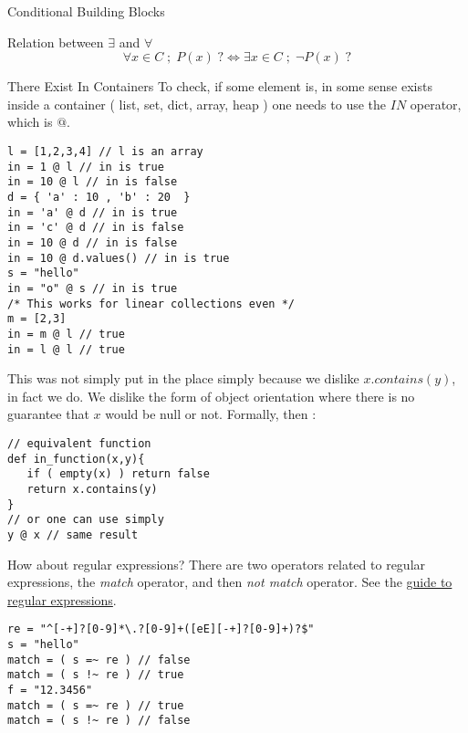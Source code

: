 \begin{section}{Conditional Building Blocks}
\begin{subsection}{Relation between $\exists$ and $\forall$ }
$$
\forall x \in C \; ; \; P(x) \; ? \Longleftrightarrow \exists x \in C \; ; \; \neg P(x) \; ?
$$
\end{subsection}

\begin{subsection}{There Exist In Containers}
To check, if some element is, in some sense exists inside a container ( list, set, dict, array, heap )
one needs to use the $IN$ operator, which is $@$. 

\begin{center}\begin{minipage}{\linewidth}
\begin{lstlisting}[style=JexlStyle]
l = [1,2,3,4] // l is an array 
in = 1 @ l // in is true 
in = 10 @ l // in is false 
d = { 'a' : 10 , 'b' : 20  }
in = 'a' @ d // in is true 
in = 'c' @ d // in is false 
in = 10 @ d // in is false 
in = 10 @ d.values() // in is true 
s = "hello"
in = "o" @ s // in is true 
/* This works for linear collections even */
m = [2,3]
in = m @ l // true 
in = l @ l // true  
\end{lstlisting}
\end{minipage}\end{center}

This was not simply put in the place simply because we dislike $x.contains(y)$, in fact we do.
We dislike the form of object orientation where there is no guarantee that $x$ would be null or not.
Formally, then :

\begin{lstlisting}[style=JexlStyle]
// equivalent function 
def in_function(x,y){
   if ( empty(x) ) return false 
   return x.contains(y) 
}
// or one can use simply 
y @ x // same result
\end{lstlisting}

How about regular expressions? There are two operators related to regular expressions,
the \emph{match} operator, and then \emph{not match} operator. 
See the \href{http://www.regular-expressions.info/quickstart.html}{guide to regular expressions}.

\begin{center}\begin{minipage}{\linewidth}
\begin{lstlisting}[style=JexlStyle]
re = "^[-+]?[0-9]*\.?[0-9]+([eE][-+]?[0-9]+)?$"
s = "hello"
match = ( s =~ re ) // false 
match = ( s !~ re ) // true 
f = "12.3456"
match = ( s =~ re ) // true 
match = ( s !~ re ) // false 
\end{lstlisting}
\end{minipage}\end{center}


\end{subsection}
\end{section}
